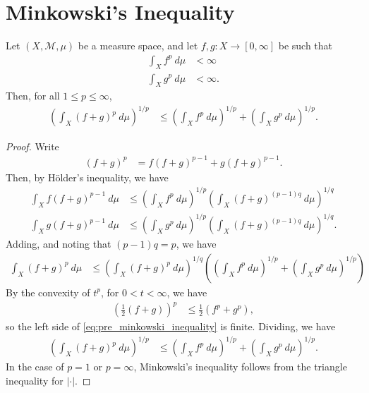 \documentclass[12pt]{mypackage}
\begin{document}
\section{Minkowski's Inequality}%
\begin{theorem}
  Let $\left( X,\mathcal{M},\mu \right)$ be a measure space, and let $f,g\colon X\rightarrow [0,\infty]$ be such that
  \begin{align*}
    \int_{X}^{} f^{p}\:d\mu &< \infty\\
    \int_{X}^{} g^{p}\:d\mu &< \infty.
  \end{align*}
  Then, for all $1 \leq p \leq \infty$,
  \begin{align*}
    \left( \int_{X}^{} \left( f + g \right)^{p}\:d\mu \right)^{1/p} &\leq \left( \int_{X}^{} f^{p}\:d\mu \right)^{1/p} + \left( \int_{X}^{} g^{p}\:d\mu \right)^{1/p}.
  \end{align*}
\end{theorem}
\begin{proof}
  Write 
  \begin{align*}
    \left( f + g \right)^{p} &= f\left( f + g \right)^{p-1} + g\left( f + g \right)^{p-1}.
  \end{align*}
  Then, by Hölder's inequality, we have
  \begin{align*}
    \int_{X}^{} f \left( f + g \right)^{p-1}\:d\mu &\leq \left( \int_{X}^{} f^{p}\:d\mu \right)^{1/p}\left( \int_{X}^{} \left( f + g \right)^{\left( p-1 \right)q}\:d\mu \right) ^{1/q}\\
    \int_{X}^{} g\left( f + g \right)^{p-1}\:d\mu &\leq \left( \int_{X}^{} g^{p}\:d\mu \right)^{1/p}\left( \int_{X}^{} \left( f + g \right)^{\left( p-1 \right)q}\:d\mu \right)^{1/q}.
  \end{align*}
  Adding, and noting that $\left( p-1 \right)q = p$, we have
  \begin{align*}
    \int_{X}^{} \left( f + g \right)^{p}\:d\mu &\leq \left( \int_{X}^{} \left( f + g \right)^{p}\:d\mu \right)^{1/q}\left( \left( \int_{X}^{} f^{p}\:d\mu \right)^{1/p} + \left( \int_{X}^{} g^{p}\:d\mu \right)^{1/p} \right)\label{eq:pre_minkowski_inequality}\tag{\textasteriskcentered}
  \end{align*}
  By the convexity of $t^{p}$, for $0 < t < \infty$, we have
  \begin{align*}
    \left( \frac{1}{2}\left( f + g \right) \right)^{p} &\leq \frac{1}{2}\left( f^{p} + g^{p} \right),
  \end{align*}
  so the left side of \eqref{eq:pre_minkowski_inequality} is finite. Dividing, we have
  \begin{align*}
    \left( \int_{X}^{} \left( f + g \right)^{p}\:d\mu \right)^{1/p} &\leq \left( \int_{X}^{} f^{p}\:d\mu \right)^{1/p} + \left( \int_{X}^{} g^{p}\:d\mu \right)^{1/p}.
  \end{align*}
  In the case of $p = 1$ or $p = \infty$, Minkowski's inequality follows from the triangle inequality for $\left\vert \cdot \right\vert$.
\end{proof}
\end{document}
